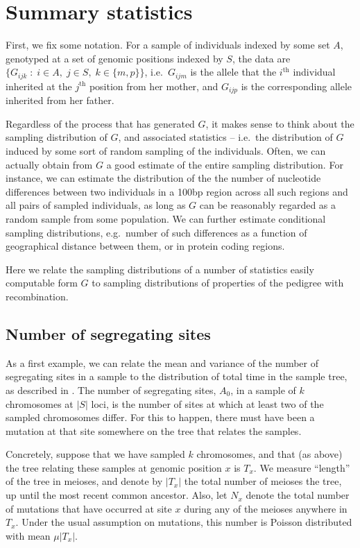 

\section{Summary statistics}

First, we fix some notation.
For a sample of individuals indexed by some set $A$,
genotyped at a set of genomic positions indexed by $S$,
the data are $\{G_{ijk} \; : \; i \in A, \; j \in S, \; k \in \{m,p\} \}$,
i.e.\ $G_{ijm}$ is the allele that the $i^\mathrm{th}$ individual inherited at the $j^\mathrm{th}$ position from her mother,
and $G_{ijp}$ is the corresponding allele inherited from her father.

Regardless of the process that has generated $G$, 
it makes sense to think about the sampling distribution of $G$,
and associated statistics --
i.e.\ the distribution of $G$ induced by some sort of random sampling of the individuals.
Often, we can actually obtain from $G$ a good estimate of the entire sampling distribution.
For instance, we can estimate the distribution of 
the the number of nucleotide differences between two individuals in a 100bp region
across all such regions and all pairs of sampled individuals,
as long as $G$ can be reasonably regarded as a random sample from some population.
We can further estimate conditional sampling distributions,
e.g.\ number of such differences as a function of geographical distance between them,
or in protein coding regions.

Here we relate the sampling distributions of a number of statistics easily computable form $G$
to sampling distributions of properties of the pedigree with recombination.


\subsection{Number of segregating sites}

As a first example,
we can relate the mean and variance of the number of segregating sites in a sample
to the distribution of total time in the sample tree, as described in \citep{hudson1990gene}.
The number of segregating sites, $A_0$, in a sample of $k$ chromosomes at $|S|$ loci,
is the number of sites at which at least two of the sampled chromosomes differ.
For this to happen, there must have been a mutation at that site somewhere on the tree that relates the samples.

Concretely, suppose that we have sampled $k$ chromosomes,
and that (as above) the tree relating these samples at genomic position $x$ is $T_x$.
We measure ``length'' of the tree in meioses,
and denote by $|T_x|$ the total number of meioses the tree,
up until the most recent common ancestor.
Also, let $N_x$ denote the total number of mutations that have occurred at site $x$ during any of the meioses anywhere in $T_x$.
Under the usual assumption on mutations,
this number is Poisson distributed with mean $\mu |T_x|$.

